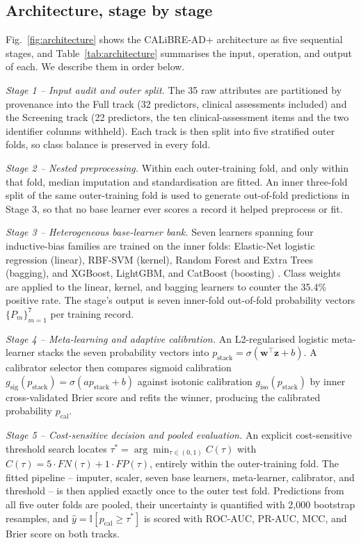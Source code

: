 \documentclass[conference]{IEEEtran}
\begin{document}
\subsection{Architecture, stage by stage}
Fig.~\ref{fig:architecture} shows the CALiBRE-AD+ architecture as five sequential stages, and Table~\ref{tab:architecture} summarises the input, operation, and output of each. We describe them in order below.

\textit{Stage 1 -- Input audit and outer split.} The 35 raw attributes are partitioned by provenance into the Full track (32 predictors, clinical assessments included) and the Screening track (22 predictors, the ten clinical-assessment items and the two identifier columns withheld). Each track is then split into five stratified outer folds, so class balance is preserved in every fold.

\textit{Stage 2 -- Nested preprocessing.} Within each outer-training fold, and only within that fold, median imputation and standardisation are fitted. An inner three-fold split of the same outer-training fold is used to generate out-of-fold predictions in Stage 3, so that no base learner ever scores a record it helped preprocess or fit.

\textit{Stage 3 -- Heterogeneous base-learner bank.} Seven learners spanning four inductive-bias families are trained on the inner folds: Elastic-Net logistic regression (linear), RBF-SVM (kernel), Random Forest and Extra Trees (bagging), and XGBoost, LightGBM, and CatBoost (boosting) \cite{b17,b18,b19}. Class weights are applied to the linear, kernel, and bagging learners to counter the 35.4\% positive rate. The stage's output is seven inner-fold out-of-fold probability vectors $\{P_m\}_{m=1}^{7}$ per training record.

\textit{Stage 4 -- Meta-learning and adaptive calibration.} An L2-regularised logistic meta-learner stacks the seven probability vectors into $p_{\mathrm{stack}} = \sigma(\mathbf{w}^\top\mathbf{z}+b)$. A calibrator selector then compares sigmoid calibration $g_{\mathrm{sig}}(p_{\mathrm{stack}}) = \sigma(ap_{\mathrm{stack}}+b)$ against isotonic calibration $g_{\mathrm{iso}}(p_{\mathrm{stack}})$ by inner cross-validated Brier score and refits the winner, producing the calibrated probability $p_{\mathrm{cal}}$.

\textit{Stage 5 -- Cost-sensitive decision and pooled evaluation.} An explicit cost-sensitive threshold search locates $\tau^{*} = \arg\min_{\tau\in(0,1)} C(\tau)$ with $C(\tau)=5\!\cdot\!FN(\tau)+1\!\cdot\!FP(\tau)$, entirely within the outer-training fold. The fitted pipeline -- imputer, scaler, seven base learners, meta-learner, calibrator, and threshold -- is then applied exactly once to the outer test fold. Predictions from all five outer folds are pooled, their uncertainty is quantified with 2{,}000 bootstrap resamples, and $\hat{y}=\mathbb{I}[p_{\mathrm{cal}}\geq\tau^{*}]$ is scored with ROC-AUC, PR-AUC, MCC, and Brier score on both tracks.
\end{document}
